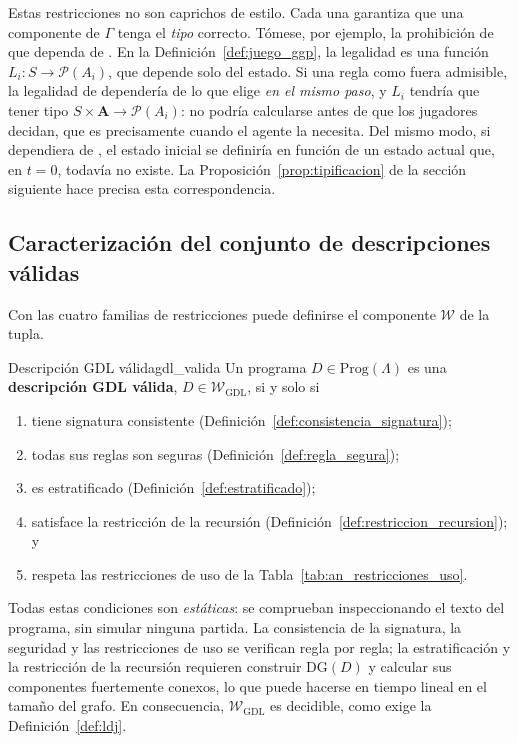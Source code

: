 Estas restricciones no son caprichos de estilo. Cada una garantiza que una componente de $\Gamma$ tenga el \emph{tipo} correcto. Tómese, por ejemplo, la prohibición de que  dependa de . En la Definición~\ref{def:juego_ggp}, la legalidad es una función $L_i : S \to \mathcal P(A_i)$, que depende solo del estado. Si una regla como  fuera admisible, la legalidad de  dependería de lo que  elige \emph{en el mismo paso}, y $L_i$ tendría que tener tipo $S \times \mathbf A \to \mathcal P(A_i)$: no podría calcularse antes de que los jugadores decidan, que es precisamente cuando el agente la necesita. Del mismo modo, si  dependiera de , el estado inicial se definiría en función de un estado actual que, en $t = 0$, todavía no existe. La Proposición~\ref{prop:tipificacion} de la sección siguiente hace precisa esta correspondencia.

\subsection{Caracterización del conjunto de descripciones válidas}

Con las cuatro familias de restricciones puede definirse el componente $\mathcal W$ de la tupla.

\begin{definicion}{Descripción GDL válida}{gdl_valida}
Un programa $D \in \mathrm{Prog}(\Lambda)$ es una \textbf{descripción GDL válida}, $D \in \mathcal W_{\mathrm{GDL}}$, si y solo si
\begin{enumerate}
    \item tiene signatura consistente (Definición~\ref{def:consistencia_signatura});
    \item todas sus reglas son seguras (Definición~\ref{def:regla_segura});
    \item es estratificado (Definición~\ref{def:estratificado});
    \item satisface la restricción de la recursión (Definición~\ref{def:restriccion_recursion}); y
    \item respeta las restricciones de uso de la Tabla~\ref{tab:an_restricciones_uso}.
\end{enumerate}
\end{definicion}

Todas estas condiciones son \emph{estáticas}: se comprueban inspeccionando el texto del programa, sin simular ninguna partida. La consistencia de la signatura, la seguridad y las restricciones de uso se verifican regla por regla; la estratificación y la restricción de la recursión requieren construir $\mathrm{DG}(D)$ y calcular sus componentes fuertemente conexos, lo que puede hacerse en tiempo lineal en el tamaño del grafo. En consecuencia, $\mathcal W_{\mathrm{GDL}}$ es decidible, como exige la Definición~\ref{def:ldj}.

